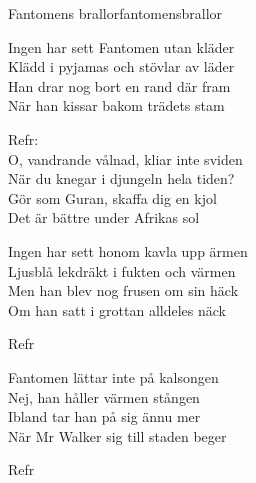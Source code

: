 \begin{song}{Fantomens brallor}{fantomensbrallor}
\begin{vers}
Ingen har sett Fantomen utan kläder\\
Klädd i pyjamas och stövlar av läder\\
Han drar nog bort en rand där fram\\
När han kissar bakom trädets stam\\
\end{vers}
\begin{vers}
Refr:\\
O, vandrande vålnad, kliar inte sviden\\
När du knegar i djungeln hela tiden?\\
Gör som Guran, skaffa dig en kjol\\
Det är bättre under Afrikas sol\\
\end{vers}
\begin{vers}
Ingen har sett honom kavla upp ärmen\\
Ljusblå lekdräkt i fukten och värmen\\
Men han blev nog frusen om sin häck\\
Om han satt i grottan alldeles näck\\
\end{vers}
\begin{vers}
Refr\\
\end{vers}
\begin{vers}
Fantomen lättar inte på kalsongen\\
Nej, han håller värmen stången\\
Ibland tar han på sig ännu mer\\
När Mr Walker sig till staden beger\\
\end{vers}
\begin{vers}
Refr\\
\end{vers}
\end{song}

